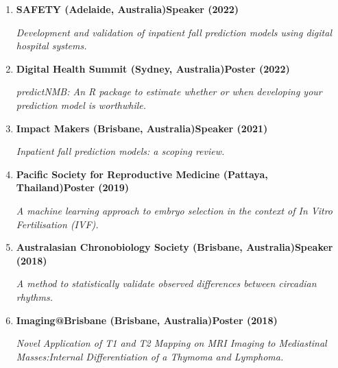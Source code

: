 \begin{enumerate}
	\item
		\textbf{SAFETY (Adelaide, Australia)}\textbf{\hfill Speaker (2022)}\par 
		\textit{Development and validation of inpatient fall prediction models using digital hospital systems.}
	\item
		\textbf{Digital Health Summit (Sydney, Australia)}\textbf{\hfill Poster (2022)}\par 
		\textit{predictNMB: An R package to estimate whether or when developing your prediction model is worthwhile.}
	\item
		\textbf{Impact Makers (Brisbane, Australia)}\textbf{\hfill Speaker (2021)}\par 
		\textit{Inpatient fall prediction models: a scoping review.}
	\item
		\textbf{Pacific Society for Reproductive Medicine (Pattaya, Thailand)}\textbf{\hfill Poster (2019)}\par 
		\textit{A machine learning approach to embryo selection in the context of In Vitro Fertilisation (IVF).}
	\item
		\textbf{Australasian Chronobiology Society (Brisbane, Australia)}\textbf{\hfill Speaker (2018)}\par 
		\textit{A method to statistically validate observed differences between circadian rhythms.}
	\item
		\textbf{Imaging@Brisbane (Brisbane, Australia)}\textbf{\hfill Poster (2018)}\par 
		\textit{Novel Application of T1 and T2 Mapping on MRI Imaging to Mediastinal Masses:Internal Differentiation of a Thymoma and Lymphoma.}
\end{enumerate}\par
